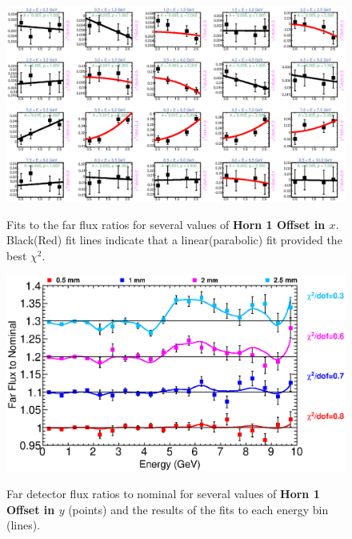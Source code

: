 \begin{figure}[ht]
  \begin{center}
    {\includegraphics[width=5.0in]{figures/Horn1XOffset_far_fits.eps}}
  \end{center}
\caption{ Fits to the far flux ratios for several values of {\bf Horn 1 Offset in $x$}. Black(Red) fit lines indicate that a linear(parabolic) fit provided the best $\chi^2$. }
\end{figure}

\begin{figure}[ht]
  \begin{center}
    {\includegraphics[width=6.0in]{figures/Horn1YOffset_far_summary.eps}}
  \end{center}
\caption{ Far detector flux ratios to nominal for several values of {\bf Horn 1 Offset in $y$} (points) and the results of the fits to each energy bin (lines).}
\end{figure}

